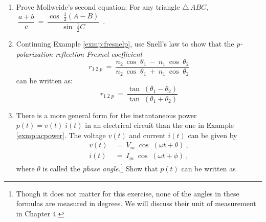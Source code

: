 {\small
\begin{enumerate}[\bfseries 1.]
 \item\label{exer:mollproof2} Prove Mollweide's second equation: For any triangle $\triangle\,ABC$,
  $~\dfrac{a+b}{c} ~=~ \dfrac{\cos\;\tfrac{1}{2}(A-B)}{\sin\;\tfrac{1}{2}C}$~.
 \item Continuing Example \ref{exmp:fresnelp}, use Snell's law to show that the
  \emph{p-polarization reflection Fresnel coefficient}
  \begin{equation}
   r_{1\;2\;p} ~=~ \frac{n_2 ~\cos\;\theta_1 ~-~ n_1 ~\cos\;\theta_2}{n_2 ~\cos\;\theta_1 ~+~
  n_1 ~\cos\;\theta_2}
  \end{equation}
  can be written as:
  \begin{displaymath}
   r_{1\;2\;p} ~=~ \frac{\tan\;(\theta_1 - \theta_2)}{\tan\;(\theta_1 + \theta_2)}
  \end{displaymath}
 \item There is a more general form for the instantaneous power $p(t) = v(t)\;i(t)$ in an electrical
  circuit than the one in Example \ref{exmp:acpower}. The voltage $v(t)$ and current $i(t)$ can be
  given by
  \begin{align*}
   v(t) ~&=~ V_m \;\cos\;(\omega t + \theta)~,\\
   i(t) ~&=~ I_m \;\cos\;(\omega t + \phi)~,
  \end{align*}
  where $\theta$ is called the \emph{phase angle}.\footnote{Though it does not matter for this
  exercise, none of the angles in these formulas are measured in degrees. We will discuss their
  unit of measurement in Chapter 4.} Show that $p(t)$ can be written as
  \begin{displaymath}

\end{displaymath}
\end{enumerate}}
